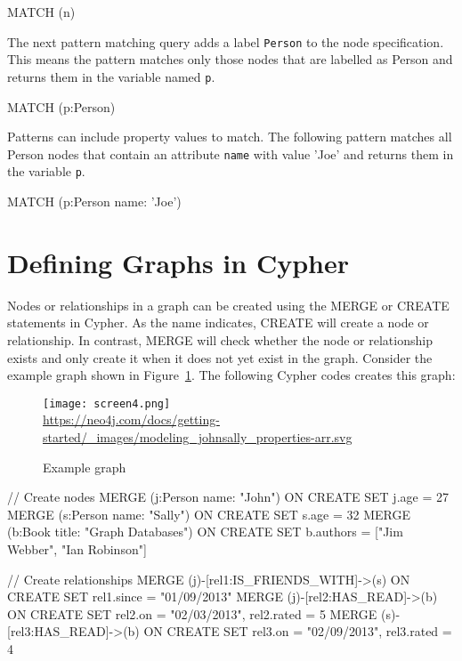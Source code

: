 \begin{cyphercode}
MATCH (n)
\end{cyphercode}

The next pattern matching query adds a label \texttt{Person} to the node specification. This means the pattern matches only those nodes that are labelled as Person and returns them in the variable named \texttt{p}.

\begin{cyphercode}
MATCH (p:Person)
\end{cyphercode}

Patterns can include property values to match. The following pattern matches all Person nodes that contain an attribute \texttt{name} with value 'Joe' and returns them in the variable \texttt{p}.

\begin{cyphercode}
MATCH (p:Person {name: 'Joe'})
\end{cyphercode}


\section{Defining Graphs in Cypher}

Nodes or relationships in a graph can be created using the MERGE or CREATE statements in Cypher. As the name indicates, CREATE will create a node or relationship. In contrast, MERGE will check whether the node or relationship exists and only create it when it does not yet exist in the graph. Consider the example graph shown in Figure~\ref{fig:johnsallyexample}. The following Cypher codes creates this graph:

\begin{figure}[h]
\centering
\texttt{[image: screen4.png]} \\

\scriptsize{\url{https://neo4j.com/docs/getting-started/_images/modeling_johnsally_properties-arr.svg}}
\caption{Example graph}
\label{fig:johnsallyexample}
\end{figure}

\begin{cyphercode}
// Create nodes
MERGE (j:Person {name: "John"})
  ON CREATE SET j.age = 27
MERGE (s:Person {name: "Sally"})
  ON CREATE SET s.age = 32
MERGE (b:Book {title: "Graph Databases"})
  ON CREATE SET b.authors = ["Jim Webber", "Ian Robinson"]
  
// Create relationships
MERGE (j)-[rel1:IS_FRIENDS_WITH]->(s)
  ON CREATE SET rel1.since = "01/09/2013"
MERGE (j)-[rel2:HAS_READ]->(b)
  ON CREATE SET rel2.on = "02/03/2013", rel2.rated = 5
MERGE (s)-[rel3:HAS_READ]->(b)
  ON CREATE SET rel3.on = "02/09/2013", rel3.rated = 4
\end{cyphercode}

